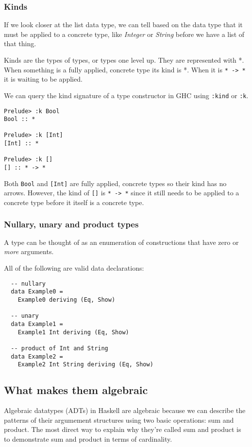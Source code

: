 \subsubsection {Kinds}
If we look closer at the list data type, we can tell based on the data type that it must be applied to a
concrete type, like \emph{Integer} or \emph{String} before we have a list of that thing.

Kinds are the types of types, or types one level up. They are represented with *. When something is a fully applied,
concrete type its kind is *. When it is \texttt{* -> *} it is waiting to be applied.

We can query the kind signature of a type constructor in GHC using \texttt{:kind} or \texttt{:k}.
\begin{verbatim}
Prelude> :k Bool
Bool :: *

Prelude> :k [Int]
[Int] :: *

Prelude> :k []
[] :: * -> *
\end{verbatim}

Both \texttt{Bool} and \texttt{[Int]} are fully applied, concrete types so their kind has no arrows. However, the
kind of \texttt{[]} is \texttt{* -> *} since it still needs to be applied to a concrete type before it itself is
a concrete type.

\subsubsection{Nullary, unary and product types}
A type can be thought of as an enumeration of constructions that have zero or \emph{more} arguments.

All of the following are valid data declarations:
\begin{lstlisting}
  -- nullary
  data Example0 =
    Example0 deriving (Eq, Show)

  -- unary
  data Example1 =
    Example1 Int deriving (Eq, Show)

  -- product of Int and String
  data Example2 =
    Example2 Int String deriving (Eq, Show)
\end{lstlisting}


\subsection{What makes them algebraic}
Algebraic datatypes (ADTs) in Haskell are algebraic because we can describe the patterns of their argumement
structures using two basic operations: sum and product. The most direct way to explain why they’re called sum
and product is to demonstrate sum and product in terms of cardinality.

